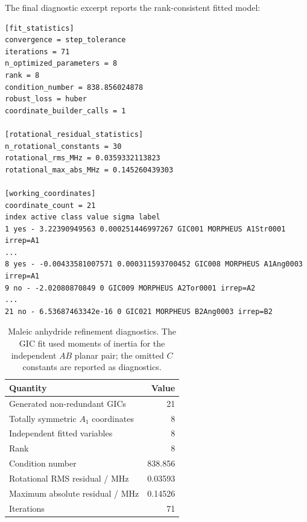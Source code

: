 \documentclass[12pt]{article}
\begin{document}
The final diagnostic excerpt reports the rank-consistent fitted model:
\begin{lstlisting}
[fit_statistics]
convergence = step_tolerance
iterations = 71
n_optimized_parameters = 8
rank = 8
condition_number = 838.856024878
robust_loss = huber
coordinate_builder_calls = 1

[rotational_residual_statistics]
n_rotational_constants = 30
rotational_rms_MHz = 0.0359332113823
rotational_max_abs_MHz = 0.145260439303

[working_coordinates]
coordinate_count = 21
index active class value sigma label
1 yes - 3.22390949563 0.000251446997267 GIC001 MORPHEUS A1Str0001 irrep=A1
...
8 yes - -0.00433581007571 0.000311593700452 GIC008 MORPHEUS A1Ang0003 irrep=A1
9 no - -2.02080870849 0 GIC009 MORPHEUS A2Tor0001 irrep=A2
...
21 no - 6.53687463342e-16 0 GIC021 MORPHEUS B2Ang0003 irrep=B2
\end{lstlisting}

\begin{table}
\caption{Maleic anhydride refinement diagnostics. The GIC fit used moments of
inertia for the independent $AB$ planar pair; the omitted $C$ constants are
reported as diagnostics.}
\label{tab:si-maleic-diagnostics}
\begin{tabular}{lr}
\toprule
Quantity & Value \\
\midrule
Generated non-redundant GICs & 21 \\
Totally symmetric $A_1$ coordinates & 8 \\
Independent fitted variables & 8 \\
Rank & 8 \\
Condition number & 838.856 \\
Rotational RMS residual / MHz & 0.03593 \\
Maximum absolute residual / MHz & 0.14526 \\
Iterations & 71 \\
\bottomrule
\end{tabular}
\end{table}
\end{document}
